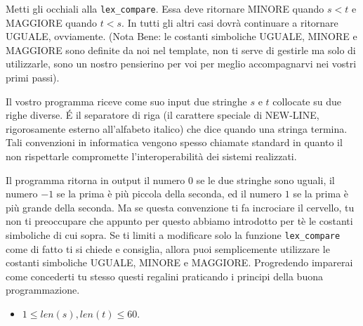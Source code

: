 Metti gli occhiali alla {\tt lex\_compare}. Essa deve ritornare MINORE quando $s<t$ e MAGGIORE quando $t<s$. In tutti gli altri casi dovrà continuare a ritornare UGUALE, ovviamente. (Nota Bene: le costanti simboliche UGUALE, MINORE e MAGGIORE sono definite da noi nel template, non ti serve di gestirle ma solo di utilizzarle, sono un nostro pensierino per voi per meglio accompagnarvi nei vostri primi passi).


Il vostro programma riceve come suo input due stringhe $s$ e $t$ collocate su due righe diverse. \'E il separatore di riga (il carattere speciale di NEW-LINE, rigorosamente esterno all'alfabeto italico) che dice quando una stringa termina. Tali convenzioni in informatica vengono spesso chiamate standard in quanto il non rispettarle compromette l'interoperabilità dei sistemi realizzati.


Il programma ritorna in output il numero $0$ se le due stringhe sono uguali, il numero $-1$ se la prima è più piccola della seconda, ed il numero $1$ se la prima è più grande della seconda. Ma se questa convenzione ti fa incrociare il cervello, tu non ti preoccupare che appunto per questo abbiamo introdotto per tè le costanti simboliche di cui sopra. Se ti limiti a modificare solo la funzione {\tt lex\_compare} come di fatto ti si chiede e consiglia, allora puoi semplicemente utilizzare le costanti simboliche UGUALE, MINORE e MAGGIORE. Progredendo imparerai come concederti tu stesso questi regalini praticando i principi della buona programmazione.







\begin{itemize}[nolistsep, noitemsep]
  \item $1 \le len(s), len(t) \le 60$.
\end{itemize}

